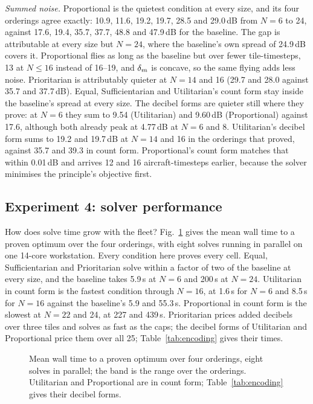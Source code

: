 \emph{Summed noise.} Proportional is the quietest condition at every size, and its four
orderings agree exactly: 10.9, 11.6, 19.2, 19.7, 28.5 and 29.0\,dB from $N=6$ to 24,
against 17.6, 19.4, 35.7, 37.7, 48.8 and 47.9\,dB for the baseline. The gap is
attributable at every size but $N=24$, where the baseline's own spread of 24.9\,dB covers
it. Proportional flies as long as the baseline but over fewer tile-timesteps, 13 at
$N\le16$ instead of 16--19, and $\delta_m$ is concave, so the same flying adds less noise.
Prioritarian is attributably quieter at $N=14$ and 16 (29.7 and 28.0 against 35.7 and
37.7\,dB). Equal, Sufficientarian and Utilitarian's count form stay inside the baseline's
spread at every size. The decibel forms are quieter still where they prove: at $N=6$ they
sum to 9.54 (Utilitarian) and 9.60\,dB (Proportional) against 17.6, although both already
peak at 4.77\,dB at $N=6$ and 8. Utilitarian's decibel form sums to 19.2 and 19.7\,dB at
$N=14$ and 16 in the orderings that proved, against 35.7 and 39.3 in count form.
Proportional's count form matches that within 0.01\,dB and arrives 12 and 16
aircraft-timesteps earlier, because the solver minimises the principle's objective first.

\subsection{Experiment 4: solver performance}
\label{sec:tractability}

How does solve time grow with the fleet? Fig.~\ref{fig:solve-time} gives the mean wall
time to a proven optimum over the four orderings, with eight solves running in parallel
on one 14-core workstation. Every condition here proves every cell. Equal,
Sufficientarian and Prioritarian solve within a factor of two of the baseline at every
size, and the baseline takes 5.9\,s at $N=6$ and 200\,s at $N=24$. Utilitarian in count
form is the fastest condition through $N=16$, at 1.6\,s for $N=6$ and 8.5\,s for $N=16$
against the baseline's 5.9 and 55.3\,s. Proportional in count form is the slowest at
$N=22$ and 24, at 227 and 439\,s. Prioritarian prices added decibels over three tiles and
solves as fast as the caps; the decibel forms of Utilitarian and Proportional price them
over all 25; Table~\ref{tab:encoding} gives their times.

\begin{figure}[t]
\centering

\caption{Mean wall time to a proven optimum over four orderings, eight solves in
parallel; the band is the range over the orderings. Utilitarian and Proportional are in
count form; Table~\ref{tab:encoding} gives their decibel forms.}
\label{fig:solve-time}
\end{figure}

